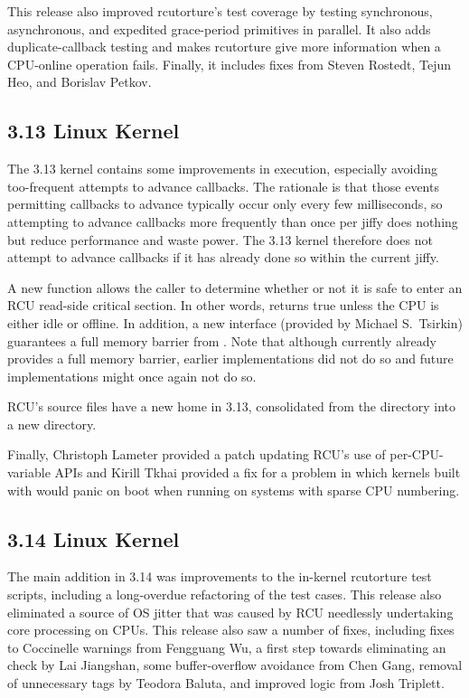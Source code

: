 This release also improved rcutorture's test coverage by testing
synchronous, asynchronous, and expedited grace-period primitives
in parallel.
It also adds duplicate-callback testing and makes rcutorture give
more information when a CPU-online operation fails.
Finally, it includes fixes from Steven Rostedt, Tejun Heo, and Borislav
Petkov.

\subsection{3.13 Linux Kernel}

The 3.13 kernel contains some improvements in 
execution, especially avoiding too-frequent attempts to advance callbacks.
The rationale is that those events permitting callbacks to advance
typically occur only every few milliseconds, so attempting to advance callbacks
more frequently than once per jiffy does nothing but reduce performance and
waste power.
The 3.13 kernel therefore does not attempt to advance callbacks if it
has already done so within the current jiffy.

A new  function allows the caller to determine
whether or not it is safe to enter an RCU read-side critical section.
In other words,  returns true unless the CPU is
either idle or offline.
In addition, a new 
interface (provided by Michael S.~Tsirkin)
guarantees a full memory barrier from .
Note that although  currently already provides
a full memory barrier, earlier implementations did not do so and
future implementations might once again not do so.

RCU's source files have a new home in 3.13, consolidated from the
 directory into a new  directory.

Finally, Christoph Lameter provided a patch updating RCU's use of
per-CPU-variable APIs and Kirill Tkhai provided a fix for a problem
in which kernels built with  would
panic on boot when running
on systems with sparse CPU numbering.

\subsection{3.14 Linux Kernel}

The main addition in 3.14 was improvements to the in-kernel rcutorture
test scripts, including a long-overdue refactoring of the test cases.
This release also eliminated a source of OS jitter that was caused
by RCU needlessly undertaking core processing on  CPUs.
This release also saw a number of fixes, including fixes to Coccinelle
warnings from Fengguang Wu, a first step towards eliminating an
 check by Lai Jiangshan, some buffer-overflow
avoidance from Chen Gang, removal of unnecessary  tags by
Teodora Baluta, and improved  logic from
Josh Triplett.
